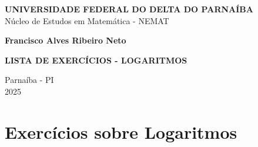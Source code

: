 \documentclass[12pt,a4paper]{article}
\begin{document}
\begin{titlepage}
  \begin{center}
    \onehalfspacing

    \textbf{UNIVERSIDADE FEDERAL DO DELTA DO PARNAÍBA} \\
    Núcleo de Estudos em Matemática - NEMAT

    \vspace{4cm}
    \textbf{Francisco Alves Ribeiro Neto}

    \vspace{3cm}
    \textbf{\LARGE LISTA DE EXERCÍCIOS - LOGARITMOS}

    \vfill
    Parnaíba - PI \\
    2025
  \end{center}
\end{titlepage}

\onehalfspacing
\section*{Exercícios sobre Logaritmos}
\end{document}
